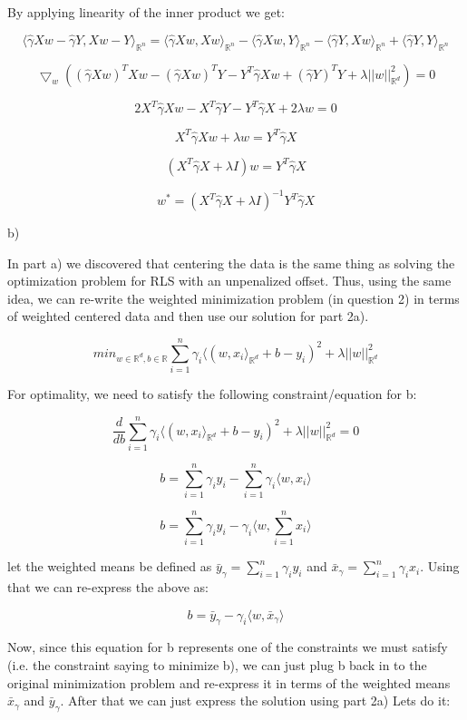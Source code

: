 \documentclass[12pt]{report}
\begin{document}
By applying linearity of the inner product we get:

$$\langle \hat{\gamma} Xw - \hat{\gamma} Y , Xw - Y \rangle_{\mathbb{R}^n}   = \langle \hat{\gamma} Xw, Xw \rangle_{\mathbb{R}^n} - \langle \hat{\gamma} Xw, Y \rangle_{\mathbb{R}^n}  -\langle  \hat{\gamma} Y, Xw \rangle_{\mathbb{R}^n} + \langle \hat{\gamma} Y, Y  \rangle_{\mathbb{R}^n} $$

$$  \bigtriangledown_w ( (\hat{\gamma} Xw)^T Xw -  (\hat{\gamma} Xw)^T Y  - Y^T  \hat{\gamma}  Xw + ( \hat{\gamma} Y)^T Y + \lambda ||w||_{\mathbb{R}^d} ^2)  = 0$$

$$ 2 X^T \hat{\gamma} Xw -  X^T \hat{\gamma} Y  -Y^T  \hat{\gamma}  X  + 2 \lambda w = 0 $$

$$ X^T \hat{\gamma} Xw + \lambda w = Y^T  \hat{\gamma}  X $$

$$ (X^T \hat{\gamma} X + \lambda I)w = Y^T  \hat{\gamma}  X $$

$$ w^* = (X^T \hat{\gamma} X + \lambda I)^{-1}Y^T  \hat{\gamma}  X $$

b)

In part a) we discovered that centering the data is the same thing as solving the optimization problem for RLS with an unpenalized offset.
Thus, using the same idea, we can re-write the weighted minimization problem (in question 2) in terms of weighted centered data and then use our solution for part 2a).

$$min_{w \in \mathbb{R}^d, b \in \mathbb{R}} \sum_{i=1}^{n}\gamma_i \langle ( w, x_i\rangle_{\mathbb{R}^d} +b - y_i)^2 + \lambda ||w||_{\mathbb{R}^d}^2$$

For optimality, we need to satisfy the following constraint/equation for b:

$$\frac{d}{db}\sum_{i=1}^{n}\gamma_i \langle ( w, x_i\rangle_{\mathbb{R}^d} +b - y_i)^2 + \lambda ||w||_{\mathbb{R}^d}^2 = 0$$

$$b = \sum^{n}_{i=1} \gamma_i y_i- \sum^{n}_{i=1} \gamma_i \langle w, x_i\rangle $$

$$b = \sum^{n}_{i=1} \gamma_i y_i-  \gamma_i \langle w, \sum^{n}_{i=1} x_i\rangle $$

let the weighted means be defined as $\bar{y}_{\gamma} = \sum^{n}_{i=1} \gamma_i y_i$ and $\bar{x}_{\gamma} = \sum^{n}_{i=1} \gamma_i x_i$. Using that we can re-express the above as:

$$b = \bar{y}_{\gamma}- \gamma_i \langle w, \bar{x}_{\gamma}\rangle $$

Now, since this equation for b represents one of the constraints we must satisfy (i.e. the constraint saying to minimize b), we can just plug b back in to the original minimization problem and re-express it in terms of the weighted means $\bar{x}_{\gamma}$ and $\bar{y}_{\gamma}$. After that we can just express the solution using part 2a) Lets do it:
\end{document}
